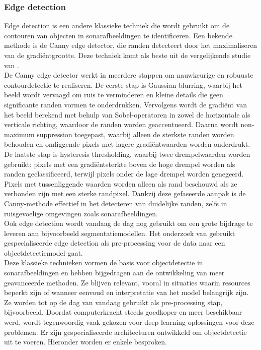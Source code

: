\subsubsection{Edge detection}

Edge detection is een andere klassieke techniek die wordt gebruikt om de contouren van objecten in sonarafbeeldingen te identificeren. \autocite{Torre_1986} Een bekende methode is de Canny edge detector, die randen detecteert door het maximaliseren van de gradiëntgrootte. Deze techniek komt als beste uit de vergelijkende studie van \textcite{Awalludin_2022}. \\

De Canny edge detector werkt in meerdere stappen om nauwkeurige en robuuste contourdetectie te realiseren. De eerste stap is Gaussian blurring, waarbij het beeld wordt vervaagd om ruis te verminderen en kleine details die geen significante randen vormen te onderdrukken. Vervolgens wordt de gradiënt van het beeld berekend met behulp van Sobel-operatoren in zowel de horizontale als verticale richting, waardoor de randen worden geaccentueerd. Daarna wordt non-maximum suppression toegepast, waarbij alleen de sterkste randen worden behouden en omliggende pixels met lagere gradiëntwaarden worden onderdrukt. De laatste stap is hysteresis thresholding, waarbij twee drempelwaarden worden gebruikt: pixels met een gradiëntsterkte boven de hoge drempel worden als randen geclassificeerd, terwijl pixels onder de lage drempel worden genegeerd. Pixels met tussenliggende waarden worden alleen als rand beschouwd als ze verbonden zijn met een sterke randpixel. Dankzij deze gefaseerde aanpak is de Canny-methode effectief in het detecteren van duidelijke randen, zelfs in ruisgevoelige omgevingen zoals sonarafbeeldingen. \autocite{Ding_2001} \\

Ook edge detection wordt vandaag de dag nog gebruikt om een grote bijdrage te leveren aan bijvoorbeeld segmentatiemodellen. Het onderzoek van \textcite{Priyadharsini_2019} gebruikt gespecialiseerde edge detection als pre-processing voor de data naar een objectdetectiemodel gaat. \\

Deze klassieke technieken vormen de basis voor objectdetectie in sonarafbeeldingen en hebben bijgedragen aan de ontwikkeling van meer geavanceerde methoden. Ze blijven relevant, vooral in situaties waarin resources beperkt zijn of wanneer eenvoud en interpretatie van het model belangrijk zijn. Ze worden tot op de dag van vandaag gebruikt als pre-processing stap, bijvoorbeeld. Doordat computerkracht steeds goedkoper en meer beschikbaar werd, wordt tegenwoordig vaak gekozen voor deep learning-oplossingen voor deze problemen. Er zijn gespecialiseerde architecturen ontwikkeld om objectdetectie uit te voeren. Hieronder worden er enkele besproken.

